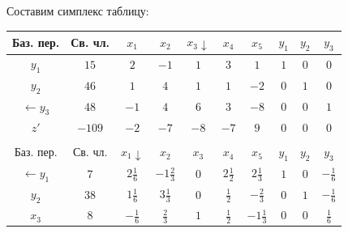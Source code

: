 \documentclass[a4paper,14pt]{extarticle}
\begin{document}
Составим симплекс таблицу:
\begin{center}
    \begin{tabular}{|c|c|c|c|c|c|c|c|c|c|}
        \hline
        Баз. пер.        & Св. чл.           & $x_1$            & $x_2$            & $x_3 \downarrow$ & $x_4 $           & $x_5$             & $y_1$           & $y_2$           & $y_3$           \\
        \hline
        $y_1$            & $15$              & $2$              & $-1$             & $1$              & $3$              & $1$               & $1$             & $0$             & $0$             \\
        \hline
        $y_2$            & $46$              & $1$              & $4$              & $1$              & $1$              & $-2$              & $0$             & $1$             & $0$             \\
        \hline
        $\leftarrow y_3$ & $48$              & $-1$             & $4$              & $6$              & $3$              & $-8$              & $0$             & $0$             & $1$             \\
        \hline
        $z'$             & $-109$            & $-2$             & $-7$             & $-8$             & $-7$             & $9$               & $0$             & $0$             & $0$             \\
        \hline
        \multicolumn{10}{c}{}                                                                                                                                                                      \\
        \hline
        Баз. пер.        & Св. чл.           & $x_1 \downarrow$ & $x_2$            & $x_3$            & $x_4 $           & $x_5$             & $y_1$           & $y_2$           & $y_3$           \\
        \hline
        $\leftarrow y_1$ & $7$               & $2\frac{1}{6}$   & $-1\frac{2}{3}$  & $0$              & $2\frac{1}{2}$   & $2\frac{1}{3}$    & $1$             & $0$             & $-\frac{1}{6}$  \\
        \hline
        $y_2$            & $38$              & $1\frac{1}{6}$   & $3\frac{1}{3}$   & $0$              & $\frac{1}{2}$    & $-\frac{2}{3}$    & $0$             & $1$             & $-\frac{1}{6}$  \\
        \hline
        $x_3$            & $8$               & $-\frac{1}{6}$   & $\frac{2}{3}$    & $1$              & $\frac{1}{2}$    & $-1\frac{1}{3}$   & $0$             & $0$             & $\frac{1}{6}$   \\

\end{tabular}
\end{center}
\end{document}

